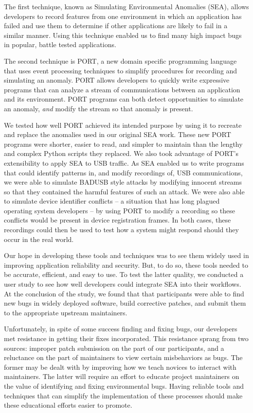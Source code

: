 The first technique,
known as Simulating Environmental Anomalies (SEA),
allows developers to record features from one environment in which
an application has failed and use them to determine if other
applications are likely to fail in a similar manner.
Using this technique enabled us to find many high impact bugs in popular,
battle tested applications.

The second technique is PORT, 
a new  domain specific programming language
that uses event processing techniques
to simplify procedures for recording and simulating an anomaly.
PORT
allows developers
to quickly write expressive programs that can analyze a stream of communications between an application and  its environment.
PORT programs can both detect opportunities to
simulate an anomaly, \textit{and} modify the stream so that anomaly is present.

We tested how well PORT achieved its intended purpose by using it to recreate and
replace the anomalies used in our original SEA work.
These new PORT programs were shorter, easier to read, and simpler to
maintain than the lengthy and complex Python scripts they replaced.
We also took advantage of PORT's extensibility to apply SEA to USB
traffic.
As SEA enabled us to write programs that could identify patterns in, and
modify recordings of, USB communications,
we were able to simulate
BADUSB style attacks by modifying innocent streams
so that they contained the harmful features of such an attack.
We were also able to simulate device identifier conflicts -- a situation that has
long plagued operating system developers -- by using PORT to modify a recording so  these conflicts
would be present in device registration frames.
In both cases, these recordings could then be used
to test how a system might respond should they occur in the real world.

Our hope in developing these tools and techniques was to see them widely
used in improving application reliability and security.
But, to do so, these tools needed to be accurate, efficient, and easy to use. To test the latter quality, we 
conducted a user study to see how well developers could integrate SEA into their workflows.
At the conclusion of the study, we found that that participants were able to find new bugs in widely deployed software,
build corrective patches,
and submit them to the appropriate upstream maintainers.

Unfortunately,
in spite of some success finding and fixing bugs,
our developers met resistance in getting their fixes incorporated.
This resistance sprang from two sources: improper patch submission on the part of our participants, and a reluctance on the part of maintainers to view certain misbehaviors as bugs.
The former may be dealt with by improving how we teach novices to interact with maintainers. The latter
will require an effort to educate project maintainers on the value of identifying and fixing environmental bugs. Having reliable tools and techniques that can  simplify the implementation of these processes should make these educational efforts easier to promote. 


\vspace*{3ex plus 1fil}
